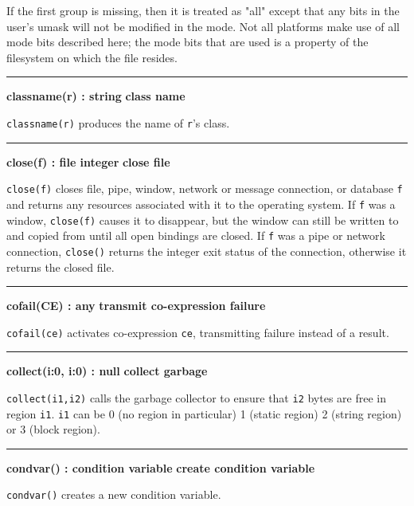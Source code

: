 If the first group is missing, then it is treated as
"all" except that any bits in the
user's umask will not be modified in the mode. Not all
platforms make use of all mode bits described here; the mode bits that
are used is a property of the filesystem on which the file resides.

\bigskip
\hrule\vspace{0.1cm}
\noindent
{\bf classname(r) : string } \hfill {\bf class name}

\noindent
\texttt{classname(r)} produces the name of \texttt{r}'s
class.

\bigskip
\hrule\vspace{0.1cm}
\noindent
{\bf close(f) : file {\textbar} integer } \hfill {\bf close file}

\noindent
{}\texttt{close(f)} closes file, pipe,
window, network or message connection, or database \texttt{f}
and returns any resources associated with it to the operating system.
If \texttt{f} was a window, \texttt{close(f)} causes it to disappear,
but the window can still be written to and copied from until all open
bindings are closed. If \texttt{f} was a pipe or network connection,
\texttt{close()} returns the integer exit
status of the connection, otherwise it returns the closed file.

\bigskip
\hrule\vspace{0.1cm}
\noindent
{\bf cofail(CE) : any } \hfill {\bf transmit co-expression failure}

\noindent
{}\texttt{cofail(ce)} activates
co-expression \texttt{ce}, transmitting failure instead of a result.

\bigskip
\hrule\vspace{0.1cm}
\noindent
{\bf collect(i:0, i:0) : null } \hfill {\bf collect garbage}

\noindent
{}\texttt{collect(i1,i2)} calls the
garbage collector to ensure that \texttt{i2} bytes
are free in region \texttt{i1}. \texttt{i1} can be 0 (no region in particular)
1 (static region) 2 (string region) or 3 (block region).

\bigskip
\hrule\vspace{0.1cm}
\noindent
{\bf condvar() : condition variable } \hfill {\bf create condition variable}

\noindent
{}\texttt{condvar()} creates
a new condition variable.

